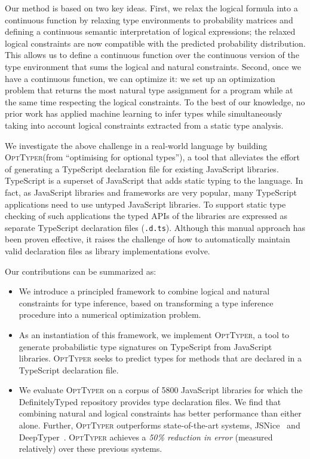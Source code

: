 \documentclass[sigplan,10pt,review,anonymous]{acmart} %
\newcommand{\projectname}{\textsc{OptTyper}\xspace}
\theoremstyle{plain}
\theoremstyle{remark}
\theoremstyle{definition}
\begin{document}
Our method is based on two key ideas.
First, we relax the logical formula into a continuous function by relaxing type environments
to probability matrices and defining
a continuous semantic interpretation of logical expressions; the relaxed logical constraints
are now compatible with the predicted probability distribution.
This allows us to define a continuous function over the continuous version of the type environment
that sums the logical and natural constraints.
Second, once we have a continuous function, we can optimize it:
we set up an optimization problem that returns the most natural type assignment for a
program while at the same time respecting the logical constraints.
To the best of our knowledge, no prior work has applied machine learning to infer types
while simultaneously taking into account logical constraints extracted from a static type analysis.

We investigate the above challenge in a real-world language by building
\projectname (from ``optimising for optional types''),
a tool that alleviates the effort of generating a
TypeScript declaration file for existing JavaScript libraries.
TypeScript is a superset of JavaScript that adds static typing to the language.
In fact, as JavaScript libraries and frameworks are very popular, many
TypeScript applications need to use untyped JavaScript libraries.
To support static type
checking of such applications the typed
APIs of the libraries are expressed as separate TypeScript
declaration files (\lstinline{.d.ts}).  Although this manual approach has been proven
effective, it raises the challenge of how to automatically maintain valid declaration files
as library implementations evolve.

Our contributions can be summarized as:
\begin{itemize}[label=\raisebox{0.25ex}{\tiny$\bullet$}]
	\item We introduce a principled framework to combine logical and natural constraints for type inference,
	      based on transforming a type inference procedure into a numerical optimization problem.
	\item As an instantiation of this framework, we implement \projectname, a tool to generate probabilistic type
	      signatures on TypeScript from JavaScript libraries.
	      \projectname seeks to predict types for methods that are declared in a TypeScript declaration file.
	\item We evaluate \projectname on a corpus of 5800 JavaScript libraries for which
	      the DefinitelyTyped repository provides type declaration files.
	      We find that combining natural and logical constraints
	      has better performance than either alone.
	      Further, \projectname outperforms state-of-the-art systems,
	      JSNice~\cite{raychev15} and DeepTyper~\cite{hellendoorn18}.
	      \projectname achieves a \emph{50\% reduction in error} (measured relatively) over these previous systems.
\end{itemize}
\end{document}
